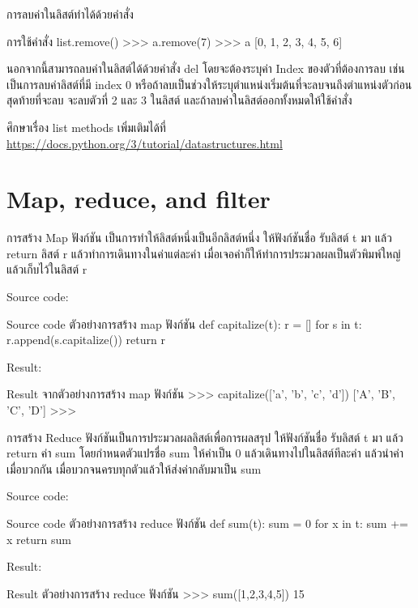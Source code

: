 การลบค่าในลิสต์ทำได้ด้วยคำสั่ง  
\begin{codelist}{การใช้คำสั่ง list.remove()}{}
>>> a.remove(7)
>>> a
[0, 1, 2, 3, 4, 5, 6]
\end{codelist}


นอกจากนี้สามารถลบค่าในลิสต์ได้ด้วยคำสั่ง del โดยจะต้องระบุค่า Index ของตัวที่ต้องการลบ เช่น   เป็นการลบค่าลิสต์ที่มี index 0 หรือถ้าลบเป็นช่วงให้ระบุตำแหน่งเริ่มต้นที่จะลบจนถึงตำแหน่งตัวก่อนสุดท้ายที่จะลบ   จะลบตัวที่ 2 และ 3 ในลิสต์ และถ้าลบค่าในลิสต์ออกทั้งหมดให้ใช้คำสั่ง  

ศึกษาเรื่อง list methods เพิ่มเติมได้ที่ \url{https://docs.python.org/3/tutorial/datastructures.html}

\section{Map, reduce, and filter}

การสร้าง Map ฟังก์ชัน เป็นการทำให้ลิสต์หนึ่งเป็นอีกลิสต์หนึ่ง ให้ฟังก์ชันชื่อ   รับลิสต์ t มา แล้ว return ลิสต์ r แล้วทำการเดินทางในค่าแต่ละค่า เมื่อเจอค่าก็ให้ทำการประมวลผลเป็นตัวพิมพ์ใหญ่ แล้วเก็บไว้ในลิสต์ r

Source code:
\begin{codelist}{Source code ตัวอย่างการสร้าง map ฟังก์ชัน}{}
def capitalize(t):
    r = []
    for s in t:
        r.append(s.capitalize())
    return r
\end{codelist}

Result:
\begin{codelist}{Result จากตัวอย่างการสร้าง map ฟังก์ชัน}{}
>>> capitalize(['a', 'b', 'c', 'd'])
['A', 'B', 'C', 'D']
>>>
\end{codelist}



การสร้าง Reduce ฟังก์ชันเป็นการประมวลผลลิสต์เพื่อการผลสรุป ให้ฟังก์ชันชื่อ   รับลิสต์ t มา แล้ว return ค่า sum โดยกำหนดตัวแปรชื่อ sum ให้ค่าเป็น 0 แล้วเดินทางไปในลิสต์ทีละค่า แล้วนำค่าเมื่อบวกกัน เมื่อบวกจนครบทุกตัวแล้วให้ส่งค่ากลับมาเป็น sum

Source code:
\begin{codelist}{Source code ตัวอย่างการสร้าง reduce ฟังก์ชัน}{}
def sum(t):
    sum = 0
    for x in t: sum += x
    return sum
\end{codelist}

Result:
\begin{codelist}{Result ตัวอย่างการสร้าง reduce ฟังก์ชัน}{}
>>> sum([1,2,3,4,5])
15
\end{codelist}


